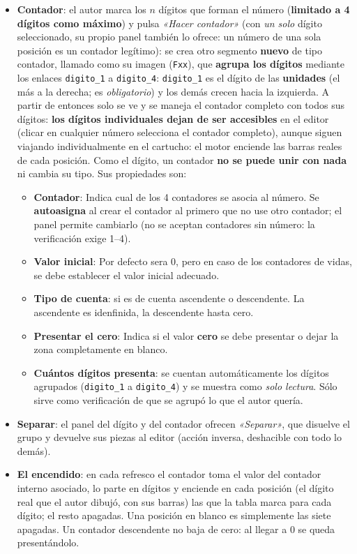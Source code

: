 \begin{itemize}
	\item \textbf{Contador}: el autor marca los $n$ dígitos que forman el número (\textbf{limitado a 4 dígitos como máximo}) y
	pulsa \emph{«Hacer contador»} (con \emph{un solo} dígito seleccionado, su
	propio panel también lo ofrece: un número de una sola posición es un
	contador legítimo): se crea otro segmento \textbf{nuevo} de tipo
	contador, llamado como su imagen (\texttt{Fxx}), que
	\textbf{agrupa los dígitos} mediante los enlaces \texttt{digito\_1} a
	\texttt{digito\_4}: \texttt{digito\_1} es el dígito de las
	\textbf{unidades} (el más a la derecha; es \emph{obligatorio}) y los
	demás crecen hacia la izquierda. A partir de entonces solo se ve y se
	maneja el contador completo con todos sus dígitos: \textbf{los dígitos individuales dejan de ser accesibles} en el editor
	(clicar en cualquier número selecciona el contador completo), aunque siguen viajando individualmente en el
	cartucho: el motor enciende las barras reales de cada posición. Como el
	dígito, un contador \textbf{no se puede unir con nada} ni cambia su tipo. Sus
	propiedades son:
	\begin{itemize}
		\item \textbf{Contador}: Indica cual de los 4 contadores se asocia al número.
		Se \textbf{autoasigna} al crear el contador al primero que no use
		otro contador; el panel permite cambiarlo (no se aceptan contadores sin
		número: la verificación exige 1--4).
		\item \textbf{Valor inicial}: Por defecto sera 0, pero en caso de los contadores de vidas, se debe establecer el valor inicial adecuado.
		\item \textbf{Tipo de cuenta}: si es de cuenta ascendente o descendente. La ascendente es idenfinida, la descendente hasta cero.
		\item \textbf{Presentar el cero}: Indica si el valor \textbf{cero} se debe presentar o dejar la zona completamente en blanco.
		\item \textbf{Cuántos dígitos presenta}: se cuentan automáticamente los
		dígitos agrupados (\texttt{digito\_1} a \texttt{digito\_4}) y se muestra
		como \emph{solo lectura}. Sólo sirve como verificación de que se agrupó
		lo que el autor quería.
	\end{itemize}
	
	\item \textbf{Separar}: el panel del dígito y del contador ofrecen
	\emph{«Separar»}, que disuelve el grupo y devuelve sus piezas al editor
	(acción inversa, deshacible con todo lo demás).
	
	\item \textbf{El encendido}: en cada refresco el contador toma el valor del
	contador interno asociado, lo parte en dígitos y enciende en cada posición
	(el dígito real que el autor dibujó, con sus barras) las que la tabla marca
	para cada dígito; el resto apagadas. Una posición en blanco es simplemente
	las siete apagadas. Un contador descendente no baja de cero: al llegar a 0
	se queda presentándolo.
\end{itemize}

